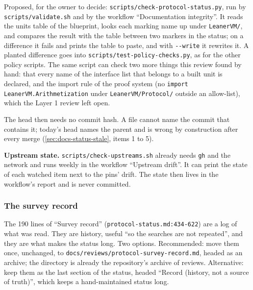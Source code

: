 \begin{sloppypar}
Proposed, for the owner to decide: \texttt{scripts/\allowbreak{}check-\allowbreak{}protocol-\allowbreak{}status.\allowbreak{}py}, run by \texttt{scripts/\allowbreak{}validate.\allowbreak{}sh} and by the workflow ``Documentation integrity''. It reads the units table of the blueprint, looks each marking name up under \texttt{LeanerVM/\allowbreak{}}, and compares the result with the table between two markers in the status; on a difference it fails and prints the table to paste, and with \texttt{-\allowbreak{}-\allowbreak{}write} it rewrites it. A planted difference goes into \texttt{scripts/\allowbreak{}test-\allowbreak{}policy-\allowbreak{}checks.\allowbreak{}py}, as for the other policy scripts. The same script can check two more things this review found by hand: that every name of the interface list that belongs to a built unit is declared, and the import rule of the proof system (no \texttt{import Leaner\allowbreak{}VM.\allowbreak{}Arithmetization} under \texttt{Leaner\allowbreak{}VM/\allowbreak{}Protocol/\allowbreak{}} outside an allow-list), which the Layer 1 review left open.
\end{sloppypar}

The head then needs no commit hash. A file cannot name the commit that contains it; today's head names the parent and is wrong by construction after every merge (\cref{sec:docs-status-stale}, items 1 to 5).

\begin{sloppypar}
\textbf{Upstream state.} \texttt{scripts/\allowbreak{}check-\allowbreak{}upstreams.\allowbreak{}sh} already needs \texttt{gh} and the network and runs weekly in the workflow ``Upstream drift''. It can print the state of each watched item next to the pins' drift. The state then lives in the workflow's report and is never committed.
\end{sloppypar}

\subsubsection{The survey record}\label{sec:docs-survey-record}

\begin{sloppypar}
The 190 lines of ``Survey record'' (\texttt{protocol-\allowbreak{}status.\allowbreak{}md:\allowbreak{}434-\allowbreak{}622}) are a log of what was read. They are history, useful ``so the searches are not repeated'', and they are what makes the status long. Two options. Recommended: move them once, unchanged, to \texttt{docs/\allowbreak{}reviews/\allowbreak{}protocol-\allowbreak{}survey-\allowbreak{}record.\allowbreak{}md}, headed as an archive; the directory is already the repository's archive of reviews. Alternative: keep them as the last section of the status, headed ``Record (history, not a source of truth)'', which keeps a hand-maintained status long.
\end{sloppypar}


